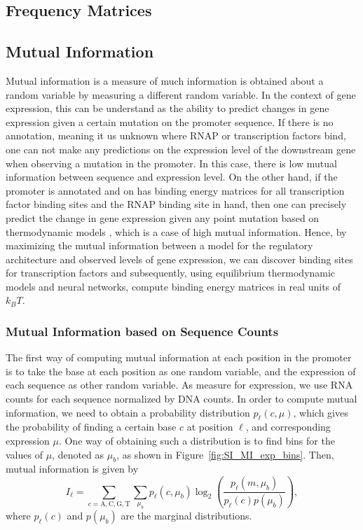 \subsection{Frequency Matrices}
\subsection{Mutual Information}
Mutual information is a measure of much information is obtained about a random variable by measuring a different random variable. In the context of gene expression, this can be understand as the ability to predict changes in gene expression given a certain mutation on the promoter sequence. If there is no annotation, meaning it us unknown where RNAP or transcription factors bind, one can not make any predictions on the expression level of the downstream gene when observing a mutation in the promoter. In this case, there is low mutual information between sequence and expression level. On the other hand, if the promoter is annotated and on has binding energy matrices for all transcription factor binding sites and the RNAP binding site in hand, then one can precisely predict the change in gene expression given any point mutation based on thermodynamic models , which is a case of high mutual information. Hence, by maximizing the mutual information between a model for the regulatory architecture and observed levels of gene expression, we can discover binding sites for transcription factors and subsequently, using equilibrium thermodynamic models and neural networks, compute binding energy matrices in real units of $k_BT$.

\subsubsection{Mutual Information based on Sequence Counts}
The first way of computing mutual information at each position in the promoter is to take the base at each position as one random variable, and the expression of each sequence as other random variable. As measure for expression, we use RNA counts for each sequence normalized by DNA counts. In order to compute mutual information, we need to obtain a probability distribution $p_\ell(c, \mu)$, which gives the probability of finding a certain base $c$ at position $\ell$, and corresponding expression $\mu$. One way of obtaining such a distribution is to find bins for the values of $\mu$, denoted as $\mu_b$, as shown in Figure~\ref{fig:SI_MI_exp_bins}. Then, mutual information is given by
\begin{equation}
    I_\ell = \sum_{c=\mathrm{A,C,G,T}} \sum_{\mu_b}p_{\ell}(c, \mu_b)\log_2\left(\frac{p_{\ell}(m, \mu_b)}{p_{\ell}(c)p(\mu_b)}\right),
\end{equation}
where $p_{\ell}(c)$ and $p(\mu_b)$ are the marginal distributions.





